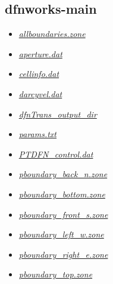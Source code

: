 \documentclass[letterpaper,10pt,english]{sphinxmanual}
\begin{document}
\subsection{dfnworks-main}
\label{output:dfnworks-main}\begin{itemize}
\item {} 
{\hyperref[output:allboundaries-zone]{\emph{allboundaries.zone}}}

\item {} 
{\hyperref[output:aperture-dat]{\emph{aperture.dat}}}

\item {} 
{\hyperref[output:cellinfo-dat]{\emph{cellinfo.dat}}}

\item {} 
{\hyperref[output:darcyvel-dat]{\emph{darcyvel.dat}}}

\item {} 
{\hyperref[output:dfntrans-output-dir]{\emph{dfnTrans\_output\_dir}}}

\item {} 
{\hyperref[output:params-txt]{\emph{params.txt}}}

\item {} 
{\hyperref[output:ptdfn-control-dat]{\emph{PTDFN\_control.dat}}}

\item {} 
{\hyperref[output:pboundary-back-n-zone]{\emph{pboundary\_back\_n.zone}}}

\item {} 
{\hyperref[output:pboundary-bottom-zone]{\emph{pboundary\_bottom.zone}}}

\item {} 
{\hyperref[output:pboundary-front-s-zone]{\emph{pboundary\_front\_s.zone}}}

\item {} 
{\hyperref[output:pboundary-left-w-zone]{\emph{pboundary\_left\_w.zone}}}

\item {} 
{\hyperref[output:pboundary-right-e-zone]{\emph{pboundary\_right\_e.zone}}}

\item {} 
{\hyperref[output:pboundary-top-zone]{\emph{pboundary\_top.zone}}}

\end{itemize}
\end{document}

